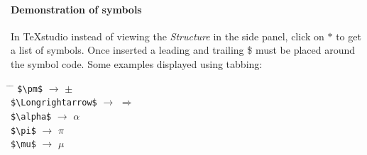 \paragraph{Demonstration of symbols}
In TeXstudio instead of viewing the \textit{Structure} in the side panel, click on $\ast$ to get a list of symbols. Once inserted a leading and trailing \$ must be placed around the symbol code. Some examples displayed using tabbing:
\begin{tabbing}
	\hspace{2in}     			\= \hspace{0.40in}  \= \hspace{1in}    		\kill
	\verb!$\pm$! 				\> $\rightarrow$ 	\> $\pm$ 				\\
	\verb!$\Longrightarrow$! 	\> $\rightarrow$ 	\> $\Longrightarrow$ 	\\
	\verb!$\alpha$! 			\> $\rightarrow$ 	\> $\alpha$ 			\\
	\verb!$\pi$! 				\> $\rightarrow$ 	\> $\pi$ 				\\
	\verb!$\mu$! 				\> $\rightarrow$ 	\> $\mu$	 			\\
\end{tabbing}